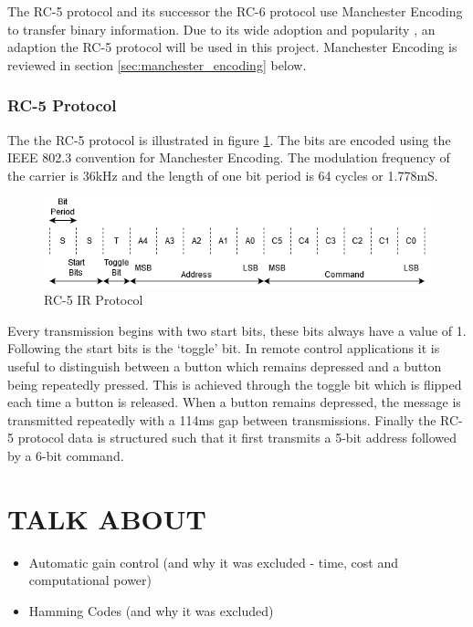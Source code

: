 The RC-5 protocol and its successor the RC-6 protocol use Manchester Encoding to transfer binary information. Due to its wide adoption and popularity \cite{rudrappa2009}, an adaption the RC-5 protocol will be used in this project. Manchester Encoding is reviewed in section \ref{sec:manchester_encoding} below.

\subsubsection{RC-5 Protocol}
\label{sec:rc_5_protocol}
The the RC-5 protocol is illustrated in figure \ref{fig:rc_5_protocol}. The bits are encoded using the IEEE 802.3 convention for Manchester Encoding. The modulation frequency of the carrier is 36kHz and the length of one bit period is 64 cycles or 1.778mS\cite{Perme2007}.

\begin{figure}[H]
	\centering
	\includegraphics[width=0.8\linewidth]{figures/litreview/rc5_protocol.png}
	\caption{RC-5 IR Protocol}
	\label{fig:rc_5_protocol}
\end{figure}

Every transmission begins with two start bits, these bits always have a value of 1. Following the start bits is the `toggle' bit. In remote control applications it is useful to distinguish between a button which remains depressed and a button being repeatedly pressed. This is achieved through the toggle bit which is flipped each time a button is released. When a button remains depressed, the message is transmitted repeatedly with a 114ms gap between transmissions. Finally the RC-5 protocol data is structured such that it first transmits a 5-bit address followed by a 6-bit command.






\section{TALK ABOUT}
\begin{itemize}
	\item Automatic gain control (and why it was excluded - time, cost and computational power)
	\item Hamming Codes (and why it was excluded)
\end{itemize}







